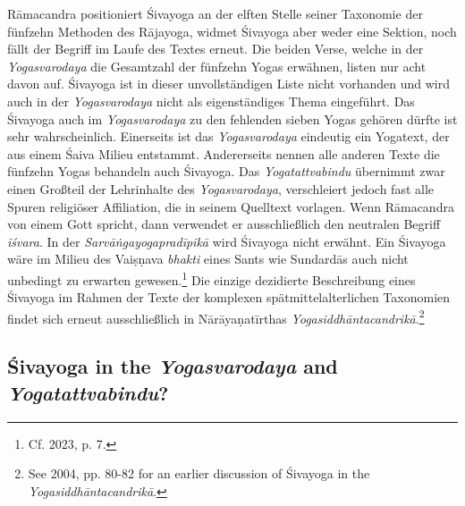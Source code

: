 Rāmacandra positioniert Śivayoga an der elften Stelle seiner Taxonomie der fünfzehn Methoden des Rājayoga, widmet Śivayoga aber weder eine Sektion, noch fällt der Begriff im Laufe des Textes erneut. Die beiden Verse, welche in der \textit{Yogasvarodaya} die Gesamtzahl der fünfzehn Yogas erwähnen, listen nur acht davon auf. Śivayoga ist in dieser unvollständigen Liste nicht vorhanden und wird auch in der \textit{Yogasvarodaya} nicht als eigenständiges Thema eingeführt. Das Śivayoga auch im \textit{Yogasvarodaya} zu den fehlenden sieben Yogas gehören dürfte ist sehr wahrscheinlich. Einerseits ist das \textit{Yogasvarodaya} eindeutig ein Yogatext, der aus einem Śaiva Milieu entstammt. Andererseits nennen alle anderen Texte die fünfzehn Yogas behandeln auch Śivayoga. Das \textit{Yogatattvabindu} übernimmt zwar einen Großteil der Lehrinhalte des \textit{Yogasvarodaya}, verschleiert jedoch fast alle Spuren religiöser Affiliation, die in seinem Quelltext vorlagen. Wenn Rāmacandra von einem Gott spricht, dann verwendet er ausschließlich den neutralen Begriff \textit{īśvara}. In der \textit{Sarvāṅgayogapradīpikā} wird Śivayoga nicht erwähnt. Ein Śivayoga wäre im Milieu des Vaiṣṇava \textit{bhakti} eines Sants wie Sundardās auch nicht unbedingt zu erwarten gewesen.\footnote{Cf. \citeauthor{horstmann2023shrine} 2023, p. 7.} Die einzige dezidierte Beschreibung eines Śivayoga im Rahmen der Texte der komplexen spätmittelalterlichen Taxonomien findet sich erneut ausschließlich in Nārāyaṇatīrthas \textit{Yogasiddhāntacandrikā}.\footnote{See \citeauthor{penna2004} 2004, pp. 80-82 for an earlier discussion of Śivayoga in the \textit{Yogasiddhāntacandrikā}.}

\subsection{Śivayoga in the \textit{Yogasvarodaya} and \textit{Yogatattvabindu}?}

